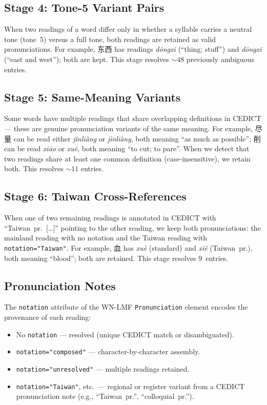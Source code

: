 \documentclass[11pt,a4paper]{article}
\begin{document}
\subsection{Stage 4: Tone-5 Variant Pairs}

When two readings of a word differ only in whether a syllable carries
a neutral tone (tone~5) versus a full tone, both readings are retained
as valid pronunciations.  For example, 东西 has readings
\emph{dōngxi} (``thing; stuff'') and \emph{dōngxī} (``east and
west''); both are kept.  This stage resolves ${\sim}48$ previously
ambiguous entries.

\subsection{Stage 5: Same-Meaning Variants}

Some words have multiple readings that share overlapping definitions
in CEDICT --- these are genuine pronunciation variants of the same
meaning.  For example, 尽量 can be read either \emph{jǐnliàng} or
\emph{jìnliàng}, both meaning ``as much as possible''; 削 can be
read \emph{xiāo} or \emph{xuē}, both meaning ``to cut; to pare''.
When we detect that two readings share at least one common definition
(case-insensitive), we retain both.  This resolves ${\sim}11$
entries.

\subsection{Stage 6: Taiwan Cross-References}

When one of two remaining readings is annotated in CEDICT with
``Taiwan~pr.\ [\ldots]'' pointing to the other reading, we keep both
pronunciations: the mainland reading with no notation and the Taiwan
reading with \texttt{notation="Taiwan"}.  For example, 血 has
\emph{xuè} (standard) and \emph{xiě} (Taiwan~pr.), both meaning
``blood''; both are retained.  This stage resolves 9~entries.

\subsection{Pronunciation Notes}

The \texttt{notation} attribute of the WN-LMF \texttt{Pronunciation}
element encodes the provenance of each reading:

\begin{itemize}[nosep]
\item No \texttt{notation} --- resolved (unique CEDICT match or
  disambiguated).
\item \texttt{notation="composed"} --- character-by-character assembly.
\item \texttt{notation="unresolved"} --- multiple readings retained.
\item \texttt{notation="Taiwan"}, etc.\ --- regional or register
  variant from a CEDICT pronunciation note (e.g., ``Taiwan~pr.'',
  ``colloquial~pr.'').
\end{itemize}
\end{document}
